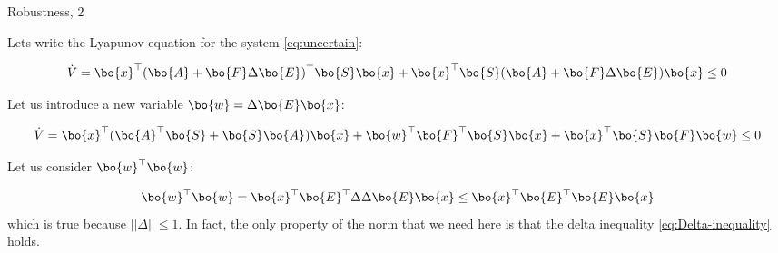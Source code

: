 \documentclass{beamer}
\begin{document}
\begin{frame}{Robustness, 2}
	\begin{flushleft}
		
		Lets write the Lyapunov equation for the system \eqref{eq:uncertain}:
		
		\begin{equation}
			\dot V = \bo{x}^\top 
			(\bo{A} + \bo{F} \Delta \bo{E})^\top\bo{S}\bo{x} + \bo{x}^\top\bo{S} (\bo{A} + \bo{F} \Delta \bo{E}) \bo{x} \leq 0
		\end{equation}
		
		Let us introduce a new variable $\bo{w} = \Delta \bo{E}\bo{x}$:
		
		\begin{equation}
			\label{eq:Lyapunov_xw}
			\dot V = \bo{x}^\top 
			(\bo{A}^\top \bo{S} + \bo{S}\bo{A}) \bo{x} + 
			\bo{w}^\top \bo{F}^\top\bo{S} \bo{x} +
			\bo{x}^\top \bo{S}\bo{F} \bo{w} \leq 0
		\end{equation}
		
		Let us consider $\bo{w}^\top \bo{w}$:
		
		\begin{equation}
			\label{eq:Delta-inequality}
			\bo{w}^\top \bo{w} = 
			\bo{x}^\top\bo{E}^\top \Delta \Delta \bo{E}\bo{x}
			\leq
			\bo{x}^\top\bo{E}^\top \bo{E}\bo{x}
		\end{equation}		
		which is true because $|| \Delta ||\leq 1$. In fact, the only property of the norm that we need here is that the delta inequality \eqref{eq:Delta-inequality} holds.
		
	\end{flushleft}
\end{frame}
\end{document}
